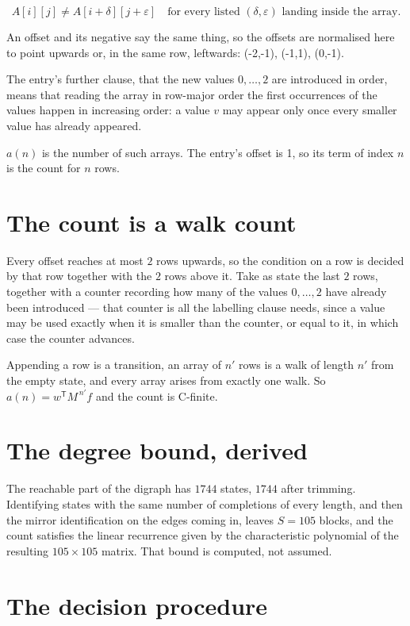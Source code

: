 \documentclass[11pt]{article}
\theoremstyle{definition}
\begin{document}
\[A[i][j] \ne A[i{+}\delta][j{+}\varepsilon]\quad\text{for every listed }(\delta,\varepsilon)\text{ landing inside the array.}\]

An offset and its negative say the same thing, so the offsets are normalised here to point upwards or, in the same row, leftwards: (-2,-1), (-1,1), (0,-1).

The entry's further clause, that the new values $0,\dots,2$ are introduced in order, means that reading the array in row-major order the first occurrences of the values happen in increasing order: a value $v$ may appear only once every smaller value has already appeared.

$a(n)$ is the number of such arrays. The entry's offset is 1, so its term of index $n$ is the count for $n$ rows.

\section{The count is a walk count}

Every offset reaches at most $2$ rows upwards, so the condition on a row is decided by that row together with the $2$ rows above it. Take as state the last $2$ rows, together with a counter recording how many of the values $0,\dots,2$ have already been introduced --- that counter is all the labelling clause needs, since a value may be used exactly when it is smaller than the counter, or equal to it, in which case the counter advances.

Appending a row is a transition, an array of $n'$ rows is a walk of length $n'$ from the empty state, and every array arises from exactly one walk. So $a(n) = w^{\mathsf T}M^{\,n'}f$ and the count is C-finite.

\section{The degree bound, derived}

The reachable part of the digraph has $1744$ states, $1744$ after trimming. Identifying states with the same number of completions of every length, and then the mirror identification on the edges coming in, leaves $S = 105$ blocks, and the count satisfies the linear recurrence given by the characteristic polynomial of the resulting $105\times105$ matrix. That bound is computed, not assumed.

\section{The decision procedure}
\end{document}
